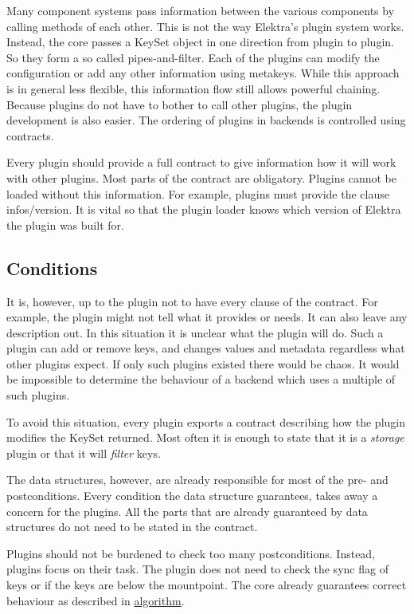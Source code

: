Many component systems pass information between the various components by calling methods of each other. This is not the way Elektra's plugin system works. Instead, the core passes a {\ttfamily Key\+Set} object in one direction from plugin to plugin. So they form a so called pipes-\/and-\/filter. Each of the plugins can modify the configuration or add any other information using metakeys. While this approach is in general less flexible, this information flow still allows powerful chaining. Because plugins do not have to bother to call other plugins, the plugin development is also easier. The ordering of plugins in backends is controlled using contracts.

Every plugin should provide a full contract to give information how it will work with other plugins. Most parts of the contract are obligatory. Plugins cannot be loaded without this information. For example, plugins must provide the clause {\ttfamily infos/version}. It is vital so that the plugin loader knows which version of Elektra the plugin was built for.

\subsection*{Conditions}

It is, however, up to the plugin not to have every clause of the contract. For example, the plugin might not tell what it provides or needs. It can also leave any description out. In this situation it is unclear what the plugin will do. Such a plugin can add or remove keys, and changes values and metadata regardless what other plugins expect. If only such plugins existed there would be chaos. It would be impossible to determine the behaviour of a backend which uses a multiple of such plugins.

To avoid this situation, every plugin exports a contract describing how the plugin modifies the {\ttfamily Key\+Set} {\ttfamily returned}. Most often it is enough to state that it is a {\itshape storage} plugin or that it will {\itshape filter} keys.

The data structures, however, are already responsible for most of the pre-\/ and postconditions. Every condition the data structure guarantees, takes away a concern for the plugins. All the parts that are already guaranteed by data structures do not need to be stated in the contract.

Plugins should not be burdened to check too many postconditions. Instead, plugins focus on their task. The plugin does not need to check the sync flag of keys or if the keys are below the mountpoint. The core already guarantees correct behaviour as described in \hyperlink{md_doc_help_elektra-algorithm_doc_help_elektra-algorithm_md}{algorithm}.

